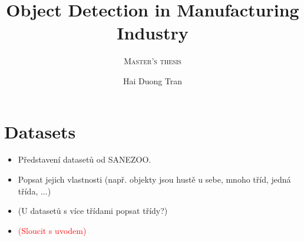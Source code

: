 \documentclass{mimosis}
\title{Object Detection in Manufacturing Industry}
\subtitle{\textsc{Master's thesis}}
\author{Hai Duong Tran}
\newcommand{\todo}[1]{\textcolor{red}{(#1)}}
\begin{document}
\frontmatter
%   
%   
%   
%   
  \tableofcontents

\mainmatter

    \let\cleardoublepage\clearpage
%   
%   
    

%     

\chapter{Datasets}
\begin{itemize}
\item Představení datasetů od SANEZOO.
\item Popsat jejich vlastnosti (např. objekty jsou hustě u sebe, mnoho tříd, jedná třída, ...)
\item (U datasetů s více třídami popsat třídy?)
\item \todo{Sloucit s uvodem}
\end{itemize}






\end{document}
